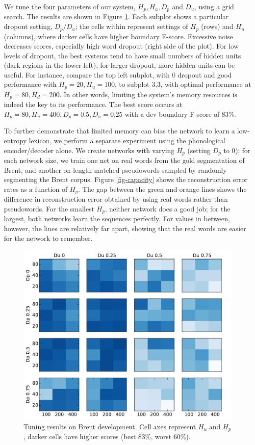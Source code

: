 \documentclass[11pt,letterpaper]{article}
\begin{document}
We tune the four parameters of our system, $H_p, H_u, D_p$ and $D_u$,
using a grid search. The results are shown in Figure
\ref{fig-gridsearch}. Each subplot shows a particular dropout setting,
$D_p/D_u$; the cells within represent settings of $H_p$ (rows) and
$H_u$ (columns), where darker cells have higher boundary
F-score. Excessive noise decreases scores, especially high word
dropout (right side of the plot). For low levels of dropout, the best
systems tend to have small numbers of hidden units (dark regions in
the lower left); for larger dropout, more hidden units can be
useful. For instance, compare the top left subplot, with 0 dropout and
good performance with $H_p=20, H_u=100$, to subplot 3,3, with optimal
performance at $H_p=80, H_d=200$. In other words, limiting the
system's memory resources is indeed the key to its performance. The
best score occurs at $H_p=80, H_u=400, D_p=0.5, D_u=0.25$ with a dev
boundary F-score of 83\%.

To further demonstrate that limited memory can bias the network to
learn a low-entropy lexicon, we perform a separate experiment using
the phonological encoder/decoder alone. We create networks with
varying $H_p$ (setting $D_p$ to 0); for each network size, we train
one net on real words from the gold segmentation of Brent, and another
on length-matched pseudowords sampled by randomly segmenting the Brent
corpus. Figure \ref{fig-capacity} shows the reconstruction error rates
as a function of $H_p$. The gap between the green and orange lines
shows the difference in reconstruction error obtained by using real
words rather than pseudowords. For the smallest $H_p$, neither network
does a good job; for the largest, both networks learn the sequences
perfectly. For values in between, however, the lines are relatively
far apart, showing that the real words are easier for the network to
remember.

\begin{figure}
\includegraphics[width=\columnwidth]{heatmap.pdf}
\caption{Tuning results on Brent development. Cell axes represent
  $H_u$ and $H_p$, darker cells have higher scores (best 83\%, worst
  60\%).}
\label{fig-gridsearch}
\end{figure}
\end{document}
